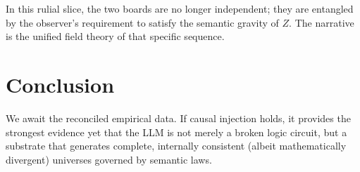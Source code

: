 \documentclass[12pt,a4paper]{article}
\begin{document}
In this rulial slice, the two boards are no longer independent; they are entangled by the observer's requirement to satisfy the semantic gravity of $Z$. The narrative is the unified field theory of that specific sequence.

\section{Conclusion}

We await the reconciled empirical data. If causal injection holds, it provides the strongest evidence yet that the LLM is not merely a broken logic circuit, but a substrate that generates complete, internally consistent (albeit mathematically divergent) universes governed by semantic laws.
\end{document}
